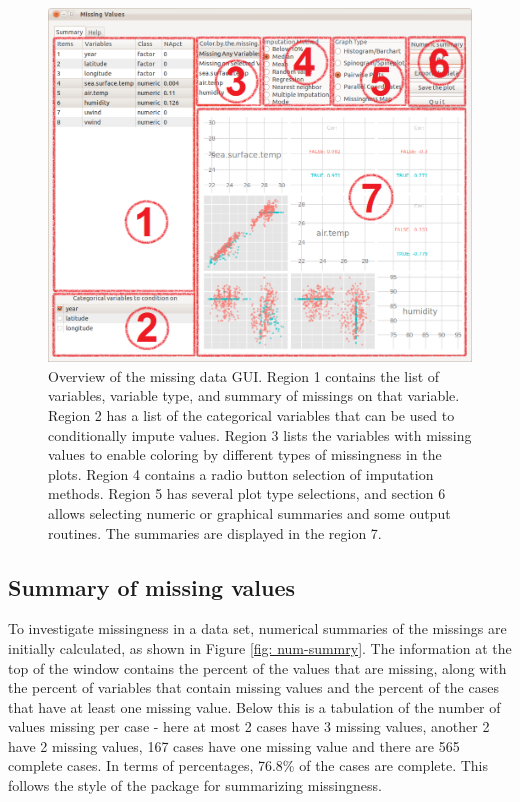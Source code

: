 \documentclass[article]{jss}
\begin{document}
\begin{center}
\begin{figure}[h]
\begin{centering}
\includegraphics[width=.9\textwidth]{fig1-1-0}
\par\end{centering}
\caption{Overview of the missing data GUI. Region 1 contains the list of variables, variable type, and summary of missings on that variable. Region 2 has a list of the categorical variables that can be used to conditionally impute values. Region 3 lists the variables with missing values to enable coloring by different types of missingness in the plots. Region 4 contains a radio button selection of imputation methods. Region 5 has several plot type selections, and section 6 allows selecting numeric or graphical summaries and some output routines. The summaries are displayed in the region 7.}
\end{figure}
\label{fig: missingGUI}
\par\end{center}

\subsection{Summary of missing values}

To investigate missingness in a data set, numerical summaries of the missings are initially calculated, as shown in Figure \ref{fig: num-summry}. The information at the top of the window contains the percent of the values that are missing, along with the percent of variables that contain missing values and the percent of the cases that have at least one missing value. Below this is a tabulation of the number of values missing per case - here at most 2 cases have 3 missing values, another 2 have 2 missing values, 167 cases have one missing value and there are 565 complete cases. In terms of percentages, 76.8\% of the cases are complete. This follows the style of the  package for summarizing missingness.
\end{document}
